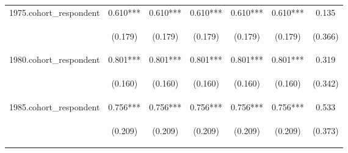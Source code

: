 \begin{center}
\begin{tabular}{lcccccc}
1975.cohort\_respondent & 0.610*** & 0.610*** & 0.610*** & 0.610*** & 0.610*** & 0.135 \\
\vspace{4pt} & \begin{footnotesize}(0.179)\end{footnotesize} & \begin{footnotesize}(0.179)\end{footnotesize} & \begin{footnotesize}(0.179)\end{footnotesize} & \begin{footnotesize}(0.179)\end{footnotesize} & \begin{footnotesize}(0.179)\end{footnotesize} & \begin{footnotesize}(0.366)\end{footnotesize} \\
1980.cohort\_respondent & 0.801*** & 0.801*** & 0.801*** & 0.801*** & 0.801*** & 0.319 \\
\vspace{4pt} & \begin{footnotesize}(0.160)\end{footnotesize} & \begin{footnotesize}(0.160)\end{footnotesize} & \begin{footnotesize}(0.160)\end{footnotesize} & \begin{footnotesize}(0.160)\end{footnotesize} & \begin{footnotesize}(0.160)\end{footnotesize} & \begin{footnotesize}(0.342)\end{footnotesize} \\
1985.cohort\_respondent & 0.756*** & 0.756*** & 0.756*** & 0.756*** & 0.756*** & 0.533 \\
\vspace{4pt} & \begin{footnotesize}(0.209)\end{footnotesize} & \begin{footnotesize}(0.209)\end{footnotesize} & \begin{footnotesize}(0.209)\end{footnotesize} & \begin{footnotesize}(0.209)\end{footnotesize} & \begin{footnotesize}(0.209)\end{footnotesize} & \begin{footnotesize}(0.373)\end{footnotesize} \\

\end{tabular}
\end{center}
